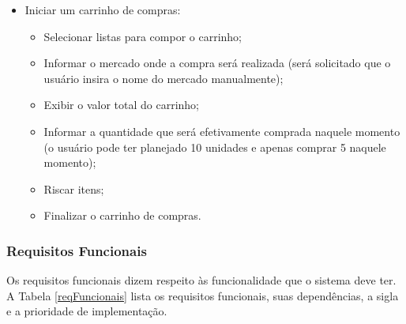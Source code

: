 \begin{itemize}
\begin{itemize}
		\end{itemize}
	\item Iniciar um carrinho de compras:
		\begin{itemize}
			\item Selecionar listas para compor o carrinho;
			\item Informar o mercado onde a compra será realizada (será solicitado que o usuário insira o nome do mercado manualmente);
			\item Exibir o valor total do carrinho;
			\item Informar a quantidade que será efetivamente comprada naquele momento (o usuário pode ter planejado 10 unidades e apenas comprar 5 naquele momento);
			\item Riscar itens;
			\item Finalizar o carrinho de compras.
		\end{itemize}
\end{itemize}

\subsubsection{Requisitos Funcionais}

Os requisitos funcionais dizem respeito às funcionalidade que o sistema deve ter. A Tabela \ref{reqFuncionais} lista os requisitos funcionais, suas dependências, a sigla e a prioridade de implementação.

